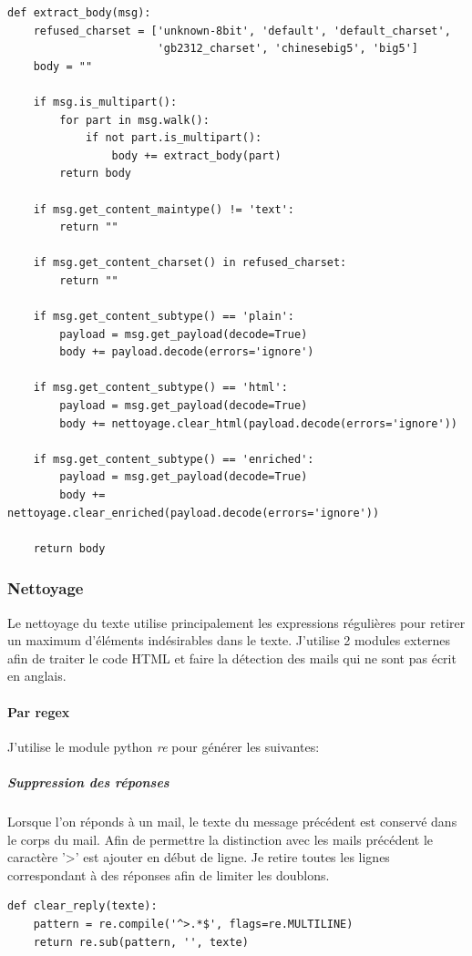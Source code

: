 \documentclass[a4paper,12pt]{article}
\begin{document}
		    	\begin{lstlisting}[title=Extraction du corps du mail]
def extract_body(msg):
    refused_charset = ['unknown-8bit', 'default', 'default_charset',
                       'gb2312_charset', 'chinesebig5', 'big5']
    body = ""

    if msg.is_multipart():
        for part in msg.walk():
            if not part.is_multipart():
                body += extract_body(part)
        return body

    if msg.get_content_maintype() != 'text':
        return ""

    if msg.get_content_charset() in refused_charset:
        return ""

    if msg.get_content_subtype() == 'plain':
        payload = msg.get_payload(decode=True)
        body += payload.decode(errors='ignore')

    if msg.get_content_subtype() == 'html':
        payload = msg.get_payload(decode=True)
        body += nettoyage.clear_html(payload.decode(errors='ignore'))

    if msg.get_content_subtype() == 'enriched':
        payload = msg.get_payload(decode=True)
        body += nettoyage.clear_enriched(payload.decode(errors='ignore'))

    return body \end{lstlisting}
	    		
		\subsubsection{Nettoyage}
			Le nettoyage du texte utilise principalement les expressions régulières pour retirer un maximum d'éléments indésirables dans le texte. J'utilise 2 modules externes afin de traiter le code HTML et faire la détection des mails qui ne sont pas écrit en anglais.
			
			\paragraph{Par regex} J'utilise le module python \emph{re} pour générer les suivantes:
				\subparagraph{Suppression des réponses} Lorsque l'on réponds à un mail, le texte du message précédent est conservé dans le corps du mail. Afin de permettre la distinction avec les mails précédent le caractère '>' est ajouter en début de ligne. Je retire toutes les lignes correspondant à des réponses afin de limiter les doublons.
				
					\begin{lstlisting}[title=Nettoyage des réponses]
def clear_reply(texte):
    pattern = re.compile('^>.*$', flags=re.MULTILINE)
    return re.sub(pattern, '', texte) \end{lstlisting}
					
\end{document}
